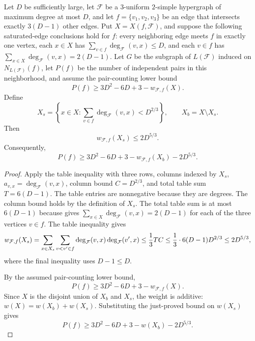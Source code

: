 \begin{lemma}
Let $D$ be sufficiently large, let $\mathcal F$ be a $3$-uniform
$2$-simple hypergraph of maximum degree at most $D$, and let
$f=\{v_1,v_2,v_3\}$ be an edge that intersects exactly $3(D-1)$ other edges.
Put $X=X(f,\mathcal F)$, and suppose the following saturated-edge conclusions
hold for $f$: every neighboring edge meets $f$ in exactly one vertex, each
$x\in X$ has
$\sum_{v\in f}\deg_{\mathcal F}(v,x)\le D$, and each $v\in f$ has
$\sum_{x\in X}\deg_{\mathcal F}(v,x)=2(D-1)$.  Let $G$ be the subgraph of
$L(\mathcal F)$ induced on $N_{L(\mathcal F)}(f)$, let $P(f)$ be the number
of independent pairs in this neighborhood, and assume the pair-counting lower
bound
\[
P(f)\ge 3D^2-6D+3-w_{\mathcal F,f}(X).
\]
Define
\[
X_s=\left\{x\in X:\sum_{v\in f}\deg_{\mathcal F}(v,x)<D^{2/3}\right\},
\qquad
X_b=X\setminus X_s .
\]
Then
\[
w_{\mathcal F,f}(X_s)\le 2D^{5/3}.
\]
Consequently,
\[
P(f)\ge 3D^2-6D+3-w_{\mathcal F,f}(X_b)-2D^{5/3}.
\]
\end{lemma}
\begin{proof}
Apply the table inequality  with three rows, columns
indexed by $X_s$,
$a_{v,x}=\deg_{\mathcal F}(v,x)$, column bound $C=D^{2/3}$, and total
table sum $T=6(D-1)$.  The table entries are nonnegative because they are
degrees.  The column bound holds by the definition of $X_s$.
The total table sum is at most $6(D-1)$ because
 gives
$\sum_{x\in X}\deg_{\mathcal F}(v,x)=2(D-1)$ for each of the three
vertices $v\in f$.  The table inequality gives
\[
w_{\mathcal F,f}(X_s)
=\sum_{x\in X_s}\sum_{v<v'\in f}
\deg_{\mathcal F}(v,x)\deg_{\mathcal F}(v',x)
\le {1\over 3}TC
\le {1\over3}\cdot6(D-1)D^{2/3}
\le 2D^{5/3},
\]
where the final inequality uses $D-1\le D$.

By the assumed pair-counting lower bound,
\[
P(f)\ge 3D^2-6D+3-w_{\mathcal F,f}(X).
\]
Since $X$ is the disjoint union of $X_b$ and $X_s$, the weight is additive:
$w(X)=w(X_b)+w(X_s)$.  Substituting the just-proved bound on $w(X_s)$ gives
\[
P(f)\ge 3D^2-6D+3-w(X_b)-2D^{5/3}.
\]
\end{proof}
